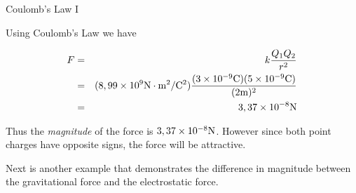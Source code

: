 \begin{wex}{Coulomb's Law I}
{ Using Coulomb's Law
we have

\begin{eqnarray*}
F &=& k\frac{Q_1Q_2}{r^2}\\
&=& (8,99\times10^{9} {\rm N\cdot m^2/C^2}) \frac{(3\times 10^{-9}{\rm C})(5\times 10^{-9}{\rm C})}{(2 {\rm m})^2}\\
&=& 3,37\times10^{-8} \rm N
\end{eqnarray*}

Thus the {\em magnitude} of the force is
$3,37\times10^{-8}\rm{N}$. However since both point charges have
opposite signs, the force will be attractive.}
\end{wex}

Next is another example that demonstrates the difference in
magnitude between the gravitational force and the electrostatic
force.


